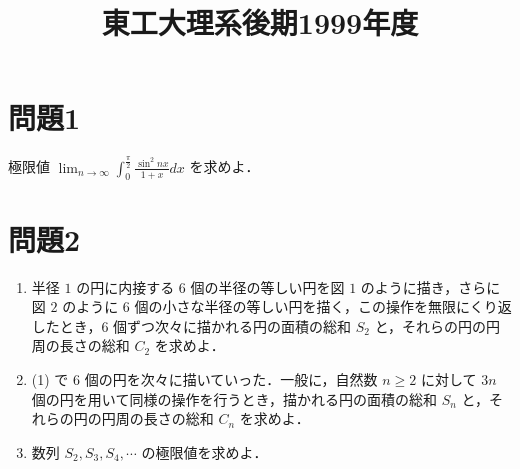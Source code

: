 \documentclass[unicode,12pt, a4paper]{ltjsarticle}%
\title{東工大理系後期1999年度}
\begin{document}
\maketitle
\section{問題1}
極限値 $\displaystyle \lim_{n \to \infty} \int_0^\frac{\pi}{2} \frac{\sin^2 nx}{1+x} dx$ を求めよ．



\section{問題2}
\begin{enumerate}
    \item 半径 $1$ の円に内接する $6$ 個の半径の等しい円を図 $1$ のように描き，さらに図 $2$ のように $6$ 個の小さな半径の等しい円を描く，この操作を無限にくり返したとき，$6$ 個ずつ次々に描かれる円の面積の総和 $S_2$ と，それらの円の円周の長さの総和 $C_2$ を求めよ．
    \item (1) で $6$ 個の円を次々に描いていった．一般に，自然数 $n \ge 2$ に対して $3n$ 個の円を用いて同様の操作を行うとき，描かれる円の面積の総和 $S_n$ と，それらの円の円周の長さの総和 $C_n$ を求めよ．
    \item 数列 $S_2, S_3, S_4, \cdots$ の極限値を求めよ．
\end{enumerate}
\end{document}
